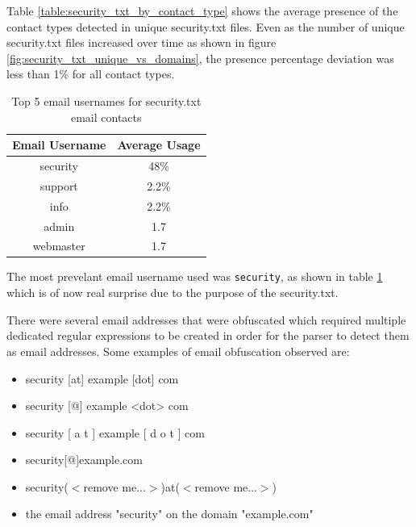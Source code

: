 \documentclass{mscreport}
\begin{document}
\noindent
Table \ref{table:security_txt_by_contact_type} shows the average presence of the contact types detected in unique security.txt files. Even as the number of unique security.txt files increased over time as shown in figure \ref{fig:security_txt_unique_vs_domains}, the presence percentage deviation was less than 1\% for all contact types.

\begin{table}[H]
  \begin{center}
    \begin{tabular}{|c|c|}  %
      \hline
      \textbf{Email Username} & \textbf{Average Usage}\\
      \hline
      security & 48\%\\
      \hline
      support & 2.2\%\\
      \hline
      info & 2.2\%\\
      \hline
      admin & 1.7\\
      \hline
      webmaster & 1.7\\
      \hline
    \end{tabular}
    \caption{Top 5 email usernames for security.txt email contacts}
    \label{table:security_txt_by_email_username} %
  \end{center}
\end{table}

\noindent
The most prevelant email username used was \texttt{security}, as shown in table \ref{table:security_txt_by_email_username} which is of now real surprise due to the purpose of the security.txt.

\vspace{0.3cm} \noindent
There were several email addresses that were obfuscated which required multiple dedicated regular expressions to be created in order for the parser to detect them as email addresses. Some examples of email obfuscation observed are:

\begin{itemize}
	\setlength\itemsep{0.01em}
    \item security [at] example [dot] com
    \item security [@] example <dot> com
    \item security [ a t ] example [ d o t ] com
    \item security[@]example.com
    \item security($<$remove me...$>$)at($<$remove me...$>$)
    \item the email address "security" on the domain "example.com"
\end{itemize}
\end{document}

